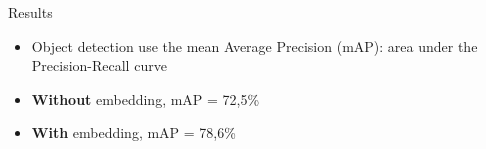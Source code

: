\documentclass[9pt,t,aspectratio=1610]{beamer}
\newcommand{\subalgo}{{\small\textsc{SPN}}\ }
\begin{document}

\begin{frame}{Results}
\begin{itemize}
    \item Object detection use the mean Average Precision (mAP): area under the Precision-Recall curve
    \item \textbf{Without} embedding, mAP = 72,5\%
    \item \textbf{With} embedding, mAP = 78,6\%
\end{itemize}
\pause


\end{frame}
\end{document}
